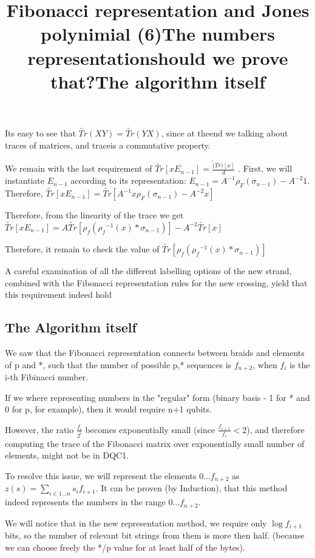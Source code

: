 \documentclass{article}
\begin{document}
{\title{Fibonacci representation and Jones polynimial (6)}
Its easy to see that \(\tilde{Tr}(XY) = \tilde{Tr}(YX)\), since at theend we talking about traces of matrices, and traceis a commutative property.

We remain with the last requirement of  \( \tilde{Tr}[xE_{n-1}]=\frac{\tilde(Tr)[x]}{d}\) . First, we will instantiate \(E_{n-1}\) according to its representation: \(E_{n-1} = A^{-1}\rho_{F}(\sigma_{n-1}) - A^{-2}1\). Therefore, \( \tilde{Tr}[xE_{n-1}] = \tilde{Tr}[A^{-1}x\rho_{F}(\sigma_{n-1}) - A^{-2}x]\)

Therefore, from the linearity of the trace we get  \( \tilde{Tr}[xE_{n-1}] = A\tilde{Tr}[{\rho_{f}({\rho_{f}}^{-1}(x) * \sigma_{n-1})}] -A^{-2}\tilde{Tr}[x]\)

Therefore, it remain to check  the value of \(\tilde{Tr}[{\rho_{f}({\rho_{f}}^{-1}(x) * \sigma_{n-1})}]\)

A careful examination of all the different labelling options of the new strand, combined with the Fibonacci representation rules for the new crossing, yield that this requirement indeed hold


\subsection{The Algorithm itself}
\title{The numbers representation}
We saw that the Fibonacci representation connects between braids and elements of p and *, such that the number of possible p,* sequences is $f_{n+2}$, when $f_{i}$ is the i-th Fibinacci number.

If we where representing numbers in the "regular" form (binary basis - 1 for * and 0 for p, for example), then it would require n+1 qubits. 

However, the ratio $\frac{f_{i}}{2^{i}}$ becomes exponentially small (since $\frac{f_{i+1}}{f_{i}} < 2 $), and therefore computing the trace of the Fibonacci matrix over exponentially small number of elements, might not be in DQC1.

To resolve this issue, we will represent the elements {0...$f_{n+2}$} as $z(s) = \sum\limits_{i \in {1...n}}{s_{i}f_{i+1}}$.
It can be proven (by Induction), that this method indeed represents the numbers in the range {0...$f_{n+2}$}. 

\title{should we prove that?}


\title{The algorithm itself}
We will notice that in the new representation method, we require only $\log{f_{i+1}}$ bits, so the number of relevant bit strings from them is more then half. (because we can choose freely the */p value for at least half of the bytes).

}
\end{document}
